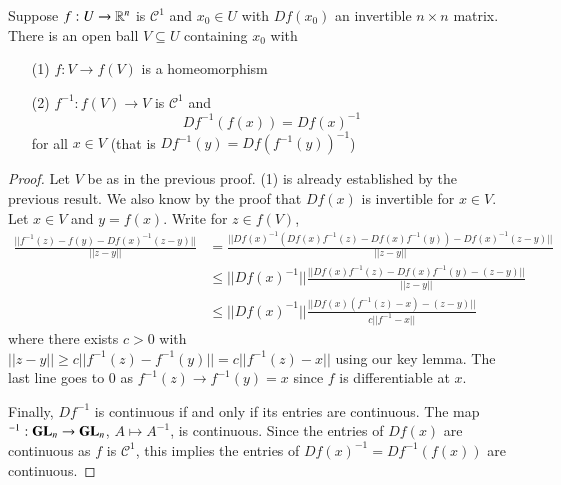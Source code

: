 \begin{theorem}
    Suppose $f:U\rightarrow \mathbb R^n$ is $\mathcal{C}^1$ and $x_0 \in U$ with $Df(x_0)$ an invertible $n\times n$ matrix. There is an open ball $V \subseteq U$ containing $x_0$ with \begin{itemize}
        \item[(1)] $f:V\rightarrow f(V)$ is a homeomorphism
        \item[(2)] $f^{-1}:f(V)\rightarrow V$ is $\mathcal{C}^1$ and $$Df^{-1}(f(x)) = Df(x)^{-1}$$ for all $x \in V$ (that is $Df^{-1}(y) = Df(f^{-1}(y))^{-1}$)
    \end{itemize}
\end{theorem}
\begin{proof}
    Let $V$ be as in the previous proof. (1) is already established by the previous result. We also know by the proof that $Df(x)$ is invertible for $x \in V$. Let $x \in V$ and $y = f(x)$. Write for $z \in f(V)$, \begin{align*}
        \frac{||f^{-1}(z) - f(y) - Df(x)^{-1}(z-y)||}{||z-y||} &= \frac{||Df(x)^{-1}(Df(x)f^{-1}(z) - Df(x)f^{-1}(y)) - Df(x)^{-1}(z-y)||}{||z-y||} \\
        &\leq ||Df(x)^{-1}||\frac{||Df(x)f^{-1}(z) - Df(x)f^{-1}(y) - (z-y)||}{||z-y||} \\
        &\leq  ||Df(x)^{-1}||\frac{||Df(x)(f^{-1}(z) - x) - (z-y)||}{c||f^{-1}-x||}
    \end{align*}
    where there exists $c > 0$ with $||z-y|| \geq c||f^{-1}(z) - f^{-1}(y)|| = c||f^{-1}(z) - x||$ using our key lemma. The last line goes to $0$ as $f^{-1}(z)\rightarrow f^{-1}(y) = x$ since $f$ is differentiable at $x$. 

    Finally, $Df^{-1}$ is continuous if and only if its entries are continuous. The map $^{-1}:\mathbf{GL}_n\rightarrow \mathbf{GL}_n$, $A\mapsto A^{-1}$, is continuous. Since the entries of $Df(x)$ are continuous as $f$ is $\mathcal{C}^1$, this implies the entries of $Df(x)^{-1} = Df^{-1}(f(x))$ are continuous.
\end{proof}


